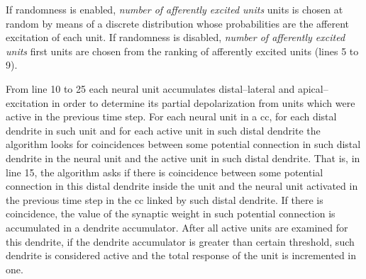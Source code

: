 {\begin{algorithm}
\begin{algorithmic}[1]
				\ENDIF
			\ENDFOR
			\ENDIF
		\ENDFOR
	\ENDFOR

\end{algorithmic}
\end{algorithm}

If randomness is enabled, \emph{number of afferently excited units} units is chosen at random by means of a discrete distribution whose probabilities are the afferent excitation of each unit. If randomness is disabled, \emph{number of afferently excited units} first units are chosen from the ranking of afferently excited units (lines 5 to 9).

From line 10 to 25 each neural unit accumulates distal--lateral and apical--excitation in order to determine its partial depolarization from units which were active in the previous time step. For each neural unit in a \gls{cc}, for each distal dendrite in such unit and for each active unit in such distal dendrite the algorithm looks for coincidences between some potential connection in such distal dendrite in the neural unit and the active unit in such distal dendrite. That is, in line 15, the algorithm asks if there is coincidence between some potential connection in this distal dendrite inside the unit and the neural unit activated in the previous time step in the \gls{cc} linked by such distal dendrite. If there is coincidence, the value of the synaptic weight in such potential connection is accumulated in a dendrite accumulator. After all active units are examined for this dendrite, if the dendrite accumulator is greater than certain threshold, such dendrite is considered active and the total response of the unit is incremented in one.

}
